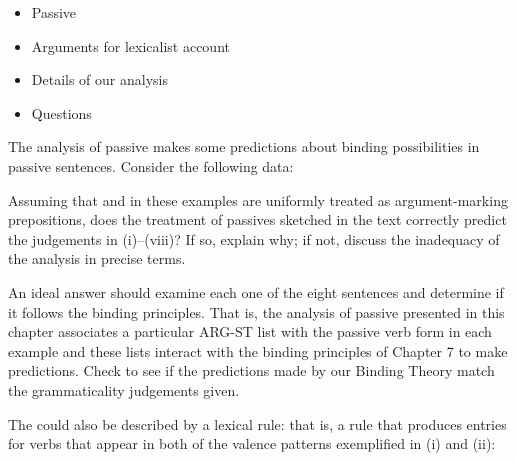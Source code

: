 \documentclass[a4paper,landscape,headrule,footrule]{foils}
\begin{document}
\begin{itemize}
\item Passive
\item Arguments for lexicalist account
\item Details of our analysis
\item Questions
\end{itemize}


The analysis of passive makes some predictions about binding possibilities
in passive sentences. Consider the following data:

\begin{exe}
 
 \bad {}
 
 \bad {}
 
 \bad {}
 
 \bad {}
\end{exe}

\noindent
Assuming that  and  in these examples are uniformly
treated as  argument-marking prepositions, 
does the treatment of passives sketched in the text
correctly predict the judgements in (i)--(viii)?
If so, explain why; if not, discuss the inadequacy of the analysis in
precise terms. 

An ideal answer should examine each one of the eight sentences and determine
if it follows the binding principles. That is, the analysis of passive
presented in this chapter associates a particular ARG-ST list with the passive
verb form in each example and these lists interact with the binding principles
of Chapter 7 to make predictions. Check to see if the predictions made by our
Binding Theory match the grammaticality judgements given. 


The  could also be described by a lexical
rule: that is, a rule that produces entries for verbs that appear in
both of the valence patterns exemplified in (i) and (ii):
\end{document}
